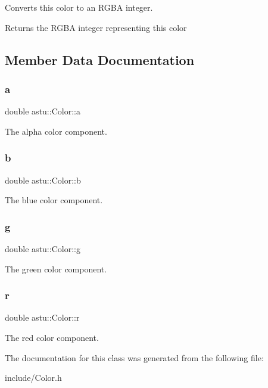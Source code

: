 Converts this color to an R\+G\+BA integer.

\begin{DoxyReturn}{Returns}
the R\+G\+BA integer representing this color 
\end{DoxyReturn}


\subsection{Member Data Documentation}
\mbox{\label{classastu_1_1Color_a001a2dcf8f1f0d4abb97f8c158bfddec}} 
\subsubsection{\texorpdfstring{a}{a}}
{\footnotesize\ttfamily double astu\+::\+Color\+::a}

The alpha color component. \mbox{\label{classastu_1_1Color_a3eaf42ee466c2e128373f5ddcb12d34c}} 
\subsubsection{\texorpdfstring{b}{b}}
{\footnotesize\ttfamily double astu\+::\+Color\+::b}

The blue color component. \mbox{\label{classastu_1_1Color_a513c1a3bd9b8c4268efafba56bda0823}} 
\subsubsection{\texorpdfstring{g}{g}}
{\footnotesize\ttfamily double astu\+::\+Color\+::g}

The green color component. \mbox{\label{classastu_1_1Color_ae1714e0caca40451f75a6b31648c6fee}} 
\subsubsection{\texorpdfstring{r}{r}}
{\footnotesize\ttfamily double astu\+::\+Color\+::r}

The red color component. 

The documentation for this class was generated from the following file\+:\begin{DoxyCompactItemize}
\item 
include/Color.\+h\end{DoxyCompactItemize}
